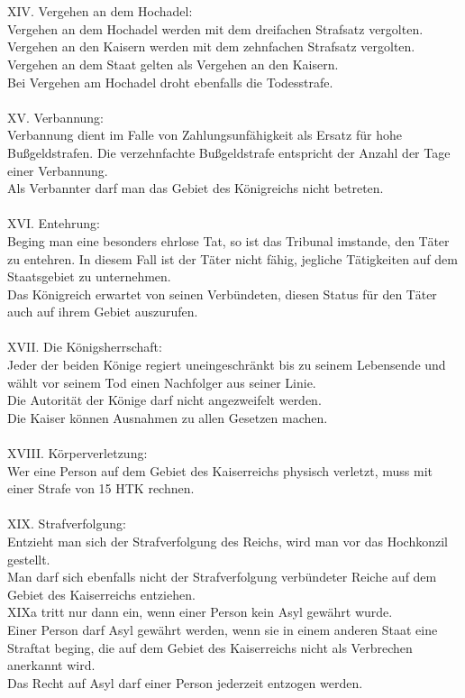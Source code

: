 \documentclass{article}
\begin{document}
\\\\
XIV. Vergehen an dem Hochadel:\\Vergehen an dem Hochadel werden mit dem dreifachen Strafsatz vergolten.\\Vergehen an den Kaisern werden mit dem zehnfachen Strafsatz vergolten.\\Vergehen an dem Staat gelten als Vergehen an den Kaisern.\\Bei Vergehen am Hochadel droht ebenfalls die Todesstrafe.
\\\\
XV. Verbannung:\\Verbannung dient im Falle von Zahlungsunfähigkeit als Ersatz für hohe Bußgeldstrafen. Die verzehnfachte Bußgeldstrafe entspricht der Anzahl der Tage einer Verbannung.\\Als Verbannter darf man das Gebiet des Königreichs nicht betreten.
\\\\
XVI. Entehrung:\\Beging man eine besonders ehrlose Tat, so ist das Tribunal imstande, den Täter zu entehren. In diesem Fall ist der Täter nicht fähig, jegliche Tätigkeiten auf dem Staatsgebiet zu unternehmen.\\Das Königreich erwartet von seinen Verbündeten, diesen Status für den Täter auch auf ihrem Gebiet auszurufen.
\\\\
XVII. Die Königsherrschaft:\\Jeder der beiden Könige regiert uneingeschränkt bis zu seinem Lebensende und wählt vor seinem Tod einen Nachfolger aus seiner Linie.\\Die Autorität der Könige darf nicht angezweifelt werden.\\Die Kaiser können Ausnahmen zu allen Gesetzen machen.
\\\\
XVIII. Körperverletzung:\\Wer eine Person auf dem Gebiet des Kaiserreichs physisch verletzt, muss mit einer Strafe von 15 HTK rechnen.
\\\\
XIX. Strafverfolgung:\\Entzieht man sich der Strafverfolgung des Reichs, wird man vor das Hochkonzil gestellt.\\Man darf sich ebenfalls nicht der Strafverfolgung verbündeter Reiche auf dem Gebiet des Kaiserreichs entziehen.\\XIXa tritt nur dann ein, wenn einer Person kein Asyl gewährt wurde.\\Einer Person darf Asyl gewährt werden, wenn sie in einem anderen Staat eine Straftat beging, die auf dem Gebiet des Kaiserreichs nicht als Verbrechen anerkannt wird.\\Das Recht auf Asyl darf einer Person jederzeit entzogen werden.
\end{document}
